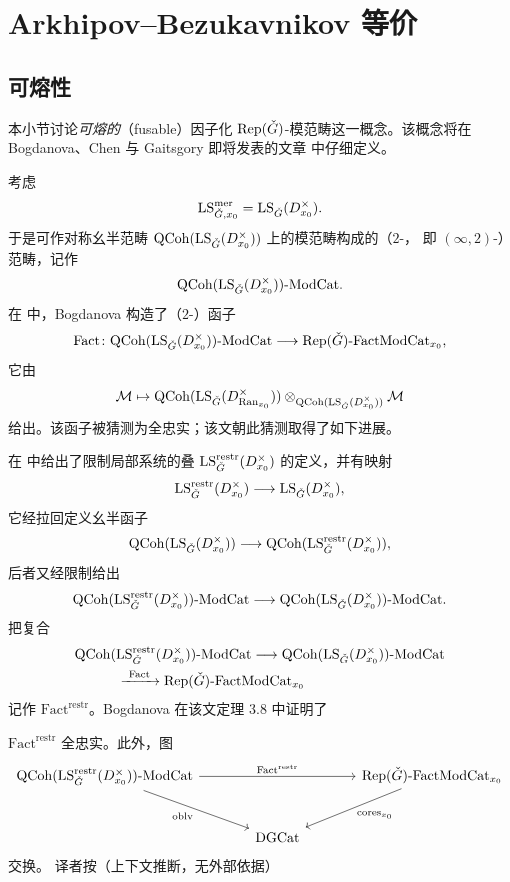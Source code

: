 
\section{Arkhipov–Bezukavnikov 等价}
\label{sec:ab}

\subsection{可熔性}
\label{sec:fusability}

本小节讨论\emph{可熔的}（fusable）因子化 $\mathrm{Rep}(\check G)$-模范畴这一概念。该概念将在
Bogdanova、Chen 与 Gaitsgory 即将发表的文章 \cite{BCG26} 中仔细定义。

考虑
\[
\mathrm{LS}^{\mathrm{mer}}_{\check G,x_0}=\mathrm{LS}_{\check G}(D^\times_{x_0}).
\]
于是可作对称幺半范畴 $\mathrm{QCoh}(\mathrm{LS}_{\check G}(D^\times_{x_0}))$ 上的模范畴构成的（$2$-，
即 $(\infty,2)$-）范畴，记作
\[
\mathrm{QCoh}(\mathrm{LS}_{\check G}(D^\times_{x_0}))\text{-}\mathrm{ModCat}.
\]
在 \cite[3.1 节]{Bog24} 中，Bogdanova 构造了（$2$-）函子
\[
\mathrm{Fact}\colon
\mathrm{QCoh}(\mathrm{LS}_{\check G}(D^\times_{x_0}))\text{-}\mathrm{ModCat}
\longrightarrow
\mathrm{Rep}(\check G)\text{-}\mathrm{FactModCat}_{x_0},
\]
它由
\[
\mathcal{M}\mapsto
\mathrm{QCoh}(\mathrm{LS}_{\check G}(D^\times_{\mathrm{Ran}_{x_0}}))
\otimes_{\mathrm{QCoh}(\mathrm{LS}_{\check G}(D^\times_{x_0}))}\mathcal{M}
\]
给出。该函子被猜测为全忠实；该文朝此猜测取得了如下进展。

在 \cite[3.3 节]{Bog24} 中给出了限制局部系统的叠
$\mathrm{LS}^{\mathrm{restr}}_{\check G}(D^\times_{x_0})$ 的定义，并有映射
\[
\mathrm{LS}^{\mathrm{restr}}_{\check G}(D^\times_{x_0})
\longrightarrow \mathrm{LS}_{\check G}(D^\times_{x_0}),
\]
它经拉回定义幺半函子
\[
\mathrm{QCoh}(\mathrm{LS}_{\check G}(D^\times_{x_0}))\longrightarrow
\mathrm{QCoh}(\mathrm{LS}^{\mathrm{restr}}_{\check G}(D^\times_{x_0})),
\]
后者又经限制给出
\[
\mathrm{QCoh}(\mathrm{LS}^{\mathrm{restr}}_{\check G}(D^\times_{x_0}))\text{-}\mathrm{ModCat}
\longrightarrow
\mathrm{QCoh}(\mathrm{LS}_{\check G}(D^\times_{x_0}))\text{-}\mathrm{ModCat}.
\]
把复合
\begin{align*}
&\mathrm{QCoh}(\mathrm{LS}^{\mathrm{restr}}_{\check G}(D^\times_{x_0}))\text{-}\mathrm{ModCat}
\longrightarrow \mathrm{QCoh}(\mathrm{LS}_{\check G}(D^\times_{x_0}))\text{-}\mathrm{ModCat}\\
&\qquad\quad
\xrightarrow{\ \mathrm{Fact}\ }\mathrm{Rep}(\check G)\text{-}\mathrm{FactModCat}_{x_0}
\end{align*}
记作 $\mathrm{Fact}^{\mathrm{restr}}$。Bogdanova 在该文定理 3.8 中证明了

\begin{proposition}
\label{prop:fact-restr-ff}
$\mathrm{Fact}^{\mathrm{restr}}$ 全忠实。此外，图
\[
\begin{tikzcd}[column sep=large,row sep=large]
\QCoh(\LS^{\mathrm{restr}}_{\check G}(D^\times_{x_0}))\text{-}\ModCat
\arrow[rr,"\mathrm{Fact}^{\mathrm{restr}}"]
\arrow[dr,"\oblv"'] & &
\Rep(\check G)\text{-}\FactModCat_{x_0}
\arrow[dl,"\mathrm{cores}_{x_0}"]\\
& \DGCat
\end{tikzcd}
\]
交换。
{译者按（上下文推断，无外部依据）}
\end{proposition}

